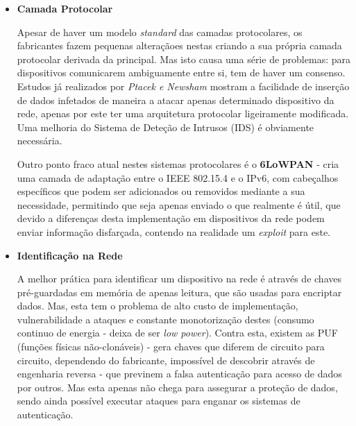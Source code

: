 \documentclass{llncs}
\begin{document}
\begin{itemize}
    \item \textbf{Camada Protocolar}

        Apesar de haver um modelo \textit{standard} das camadas protocolares, os fabricantes fazem pequenas alteraçãoes nestas criando a sua própria camada protocolar derivada da principal. Mas isto causa uma série de problemas: para dispositivos comunicarem ambiguamente entre si, tem de haver um consenso. Estudos já realizados por \textit{Ptacek e Newsham} mostram a facilidade de inserção de dados infetados de maneira a atacar apenas determinado dispositivo da rede, apenas por este ter uma arquitetura protocolar ligeiramente modificada. Uma melhoria do Sistema de Deteção de Intrusos (IDS) é obviamente necessária.\par
        Outro ponto fraco atual nestes sistemas protocolares é o \textbf{6LoWPAN} - cria uma camada de adaptação entre o IEEE 802.15.4 e o IPv6, com cabeçalhos específicos que podem ser adicionados ou removidos mediante a sua necessidade, permitindo que seja apenas enviado o que realmente é útil, que devido a diferenças desta implementação em dispositivos da rede podem enviar informação disfarçada, contendo na realidade um \textit{exploit} para este.\newline

    \item \textbf{Identificação na Rede}
        
        A melhor prática para identificar um dispositivo na rede é através de chaves pré-guardadas em memória de apenas leitura, que são usadas para encriptar dados. Mas, esta tem o problema de alto custo de implementação, vulnerabilidade a ataques e constante monotorização destes (consumo continuo de energia - deixa de ser \textit{low power}). Contra esta, existem as PUF (funções físicas não-clonáveis) - gera chaves que diferem de circuito para circuito, dependendo do fabricante, impossível de descobrir através de engenharia reversa - que previnem a falsa autenticação para acesso de dados por outros.
        Mas esta apenas não chega para assegurar a proteção de dados, sendo ainda possível executar ataques para enganar os sistemas de autenticação.\newline
        

\end{itemize}
\end{document}
